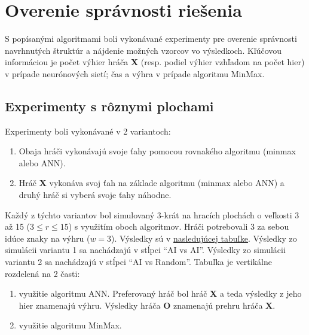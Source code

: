 \section{Overenie správnosti riešenia}\label{sec:experiments}
S popísanými algoritmami boli vykonávané experimenty pre overenie správnosti navrhnutých štruktúr a nájdenie možných
vzorcov vo výsledkoch.
Kľúčovou informáciou je počet výhier hráča \textbf{X} (resp. podiel výhier vzhľadom na počet hier) v prípade
neurónových sietí; čas a výhra v prípade algoritmu MinMax.

\subsection{Experimenty s rôznymi plochami}\label{subsec:experiments-board}

Experimenty boli vykonávané v 2 variantoch:
\begin{enumerate}
    \item Obaja hráči vykonávajú svoje ťahy pomocou rovnakého algoritmu (minmax alebo ANN).
    \item Hráč \textbf{X} vykonáva svoj ťah na základe algoritmu (minmax alebo ANN) a druhý hráč si vyberá svoje ťahy náhodne.
\end{enumerate}
Každý z týchto variantov bol simulovaný 3-krát na hracích plochách o veľkosti 3 až 15 ($3 \leq r \leq 15$) s využitím oboch algoritmov.
Hráči potrebovali 3 za sebou idúce znaky na výhru ($w = 3$).
Výsledky sú v \hyperref[table:experiments-boards]{nasledujúcej tabuľke}.
Výsledky zo simulácii variantu 1 sa nachádzajú v stĺpci \enquote{AI vs AI}.
Výsledky zo simulácii variantu 2 sa nachádzajú v stĺpci \enquote{AI vs Random}.
Tabuľka je vertikálne rozdelená na 2 časti:
\begin{enumerate}
    \item využitie algoritmu ANN.
    Preferovaný hráč bol hráč \textbf{X} a teda výsledky z jeho hier znamenajú výhru.
    Výsledky hráča \textbf{O} znamenajú prehru hráča \textbf{X}.
    \item využitie algoritmu MinMax.
\end{enumerate}

